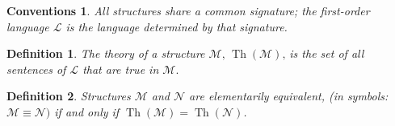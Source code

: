 \documentclass[12pt]{article}
\newtheorem{definition}{Definition}
\newtheorem{conv}{Conventions}
\newcommand{\theory}{\operatorname{Th}}
\begin{document}
\begin{conv} All structures share a common signature; the first-order
language $\mathcal{L}$ is the language determined by that signature. 
\end{conv}
\begin{definition}The \emph{theory} of a structure $\mathcal{M}\text{, }\theory(\mathcal{M})\text{,}$ 
is the set of all sentences
of $\mathcal{L}$ that are true in $\mathcal{M}.$
\end{definition}
\begin{definition}Structures $\mathcal{M}$ and $\mathcal{N}$ are \emph{elementarily equivalent},
(in symbols: $\mathcal{M} \equiv \mathcal{N})$ if and only if
$\theory(\mathcal{M}) = \theory(\mathcal{N})$.
\end{definition}

\end{document}
